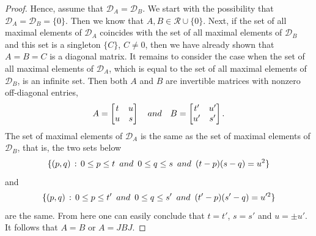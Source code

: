 \documentclass[10pt,a4paper]{amsart}
\begin{document}
\begin{proof}
Hence, assume that $\mathcal{D}_A = \mathcal{D}_B$. We start with the possibility that  $\mathcal{D}_A = \mathcal{D}_B = \{ 0 \}$. Then we know that 
$A,B \in \mathcal{R} \cup \{ 0 \}$. Next, if the set of all maximal elements of $\mathcal{D}_A$ coincides with the set of all maximal elements of $\mathcal{D}_B$ and this set is a singleton $\{ C \}$, $C\not= 0$, then we have already shown that $A=B=C$ is a diagonal matrix. It remains to consider the case when the set of all maximal elements of
$\mathcal{D}_A$, which is equal to  the set of all maximal elements of
$\mathcal{D}_B$, is an infinite set. Then both $A$ and $B$ are invertible matrices with nonzero off-diagonal entries,
$$
A =  \left[ \begin{matrix} t& u \cr u & s \cr \end{matrix} \right] \ \ \ {\rm and} \ \ \ B =  \left[ \begin{matrix} t'& u' \cr u' & s' \cr \end{matrix} \right].
$$
The set of maximal elements of $\mathcal{D}_A$ is the same as the set 
of maximal elements of $\mathcal{D}_B$, that is, the two sets below
$$
\{ (p,q)\, : \, 0\le p \le t \ \, {\rm and} \ \, 0 \le q \le s \ \, {\rm and} \ \, (t-p)(s-q) = u^2  \}$$ and $$
\{ (p,q)\, : \, 0\le p \le t' \ \, {\rm and} \ \, 0 \le q \le s' \ \, {\rm and} \ \, (t'-p)(s'-q) = u'^2  \} 
$$
are the same. From here one can easily conclude that $t=t'$, $s=s'$ and $u = \pm u'$. It follows that $A=B$ or $A = JBJ$.
\end{proof}
\end{document}
